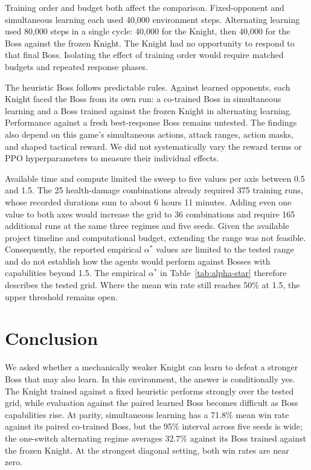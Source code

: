 \documentclass{article}
\begin{document}
Training order and budget both affect the comparison. Fixed-opponent and simultaneous learning each used 40,000 environment steps. Alternating learning used 80,000 steps in a single cycle: 40,000 for the Knight, then 40,000 for the Boss against the frozen Knight. The Knight had no opportunity to respond to that final Boss. Isolating the effect of training order would require matched budgets and repeated response phases.

The heuristic Boss follows predictable rules. Against learned opponents, each Knight faced the Boss from its own run: a co-trained Boss in simultaneous learning and a Boss trained against the frozen Knight in alternating learning. Performance against a fresh best-response Boss remains untested. The findings also depend on this game's simultaneous actions, attack ranges, action masks, and shaped tactical reward. We did not systematically vary the reward terms or PPO hyperparameters to measure their individual effects.

Available time and compute limited the sweep to five values per axis between 0.5 and 1.5. The 25 health-damage combinations already required 375 training runs, whose recorded durations sum to about 6 hours 11 minutes. Adding even one value to both axes would increase the grid to 36 combinations and require 165 additional runs at the same three regimes and five seeds. Given the available project timeline and computational budget, extending the range was not feasible. Consequently, the reported empirical $\alpha^*$ values are limited to the tested range and do not establish how the agents would perform against Bosses with capabilities beyond 1.5. The empirical $\alpha^*$ in Table~\ref{tab:alpha-star} therefore describes the tested grid. Where the mean win rate still reaches 50\% at 1.5, the upper threshold remains open.


\section{Conclusion}
We asked whether a mechanically weaker Knight can learn to defeat a stronger Boss that may also learn. In this environment, the answer is conditionally yes. The Knight trained against a fixed heuristic performs strongly over the tested grid, while evaluation against the paired learned Boss becomes difficult as Boss capabilities rise. At parity, simultaneous learning has a 71.8\% mean win rate against its paired co-trained Boss, but the 95\% interval across five seeds is wide; the one-switch alternating regime averages 32.7\% against its Boss trained against the frozen Knight. At the strongest diagonal setting, both win rates are near zero.
\end{document}
